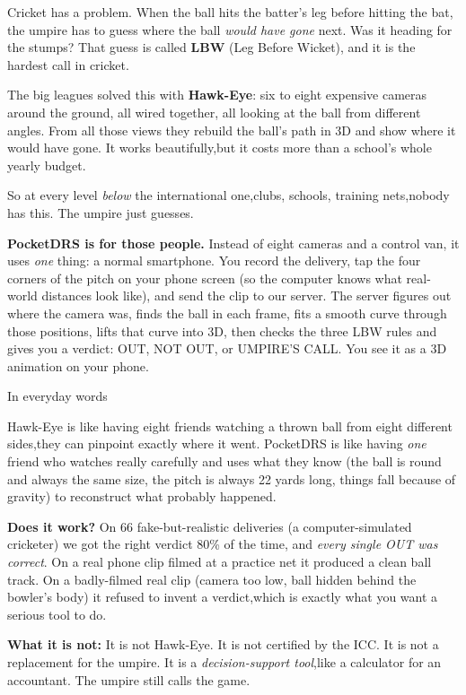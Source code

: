 \documentclass[11pt,a4paper]{article}
\newcommand{\analogy}[1]{%
  \par\vspace{6pt}%
  \noindent
  \colorbox{WarmTint}{%
    \begin{minipage}{\dimexpr\textwidth-2\fboxsep\relax}%
      \color{white}\bfseries\strut In everyday words%
    \end{minipage}%
  }\par\nobreak
  \noindent
  \colorbox{MutedBg}{%
    \begin{minipage}{\dimexpr\textwidth-2\fboxsep\relax}%
      \color{black}\setlength{\parskip}{4pt}\strut #1\strut%
    \end{minipage}%
  }%
  \par\vspace{6pt}%
}
\begin{document}
Cricket has a problem. When the ball hits the batter's leg before hitting the bat, the umpire has to guess where the ball \emph{would have gone} next. Was it heading for the stumps? That guess is called \textbf{LBW} (Leg Before Wicket), and it is the hardest call in cricket.

The big leagues solved this with \textbf{Hawk-Eye}: six to eight expensive cameras around the ground, all wired together, all looking at the ball from different angles. From all those views they rebuild the ball's path in 3D and show where it would have gone. It works beautifully,but it costs more than a school's whole yearly budget.

So at every level \emph{below} the international one,clubs, schools, training nets,nobody has this. The umpire just guesses.

\textbf{PocketDRS is for those people.} Instead of eight cameras and a control van, it uses \emph{one} thing: a normal smartphone. You record the delivery, tap the four corners of the pitch on your phone screen (so the computer knows what real-world distances look like), and send the clip to our server. The server figures out where the camera was, finds the ball in each frame, fits a smooth curve through those positions, lifts that curve into 3D, then checks the three LBW rules and gives you a verdict: OUT, NOT OUT, or UMPIRE'S CALL. You see it as a 3D animation on your phone.

\analogy{Hawk-Eye is like having eight friends watching a thrown ball from eight different sides,they can pinpoint exactly where it went. PocketDRS is like having \emph{one} friend who watches really carefully and uses what they know (the ball is round and always the same size, the pitch is always 22 yards long, things fall because of gravity) to reconstruct what probably happened.}

\textbf{Does it work?} On 66 fake-but-realistic deliveries (a computer-simulated cricketer) we got the right verdict 80\% of the time, and \emph{every single OUT was correct}. On a real phone clip filmed at a practice net it produced a clean ball track. On a badly-filmed real clip (camera too low, ball hidden behind the bowler's body) it refused to invent a verdict,which is exactly what you want a serious tool to do.

\textbf{What it is not:} It is not Hawk-Eye. It is not certified by the ICC. It is not a replacement for the umpire. It is a \emph{decision-support tool},like a calculator for an accountant. The umpire still calls the game.
\end{document}
